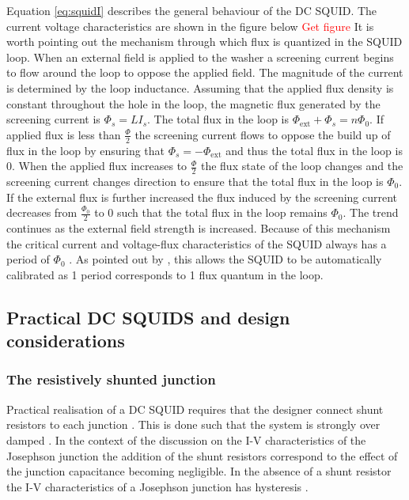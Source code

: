 Equation \ref{eq:squidI} describes the general behaviour of the DC SQUID. The current voltage characteristics are shown in the figure below \textcolor{red}{Get figure} \newline
It is worth pointing out the mechanism through which flux is quantized in the SQUID loop. When an external field is applied to the washer a screening current begins to flow around the loop to oppose the applied field. The magnitude of the current is determined by the loop inductance. Assuming that the applied flux density is constant throughout the hole in the loop, the magnetic flux generated by the screening current is $\Phi_s = LI_s$. The total flux in the loop is $\Phi_{\text{ext}} + \Phi_{s} = n\Phi_0$. If applied flux is less than $\frac{\Phi}{2}$ the screening current flows to oppose the build up of flux in the loop by ensuring that $\Phi_s = -\Phi_{\text{ext}}$ and thus the total flux in the loop is 0. When the applied flux increases to $\frac{\Phi}{2}$ the flux state of the loop changes and the screening current changes direction \cite{Drung2016NBSQUIDS} to ensure that the total flux in the loop is $\Phi_0$. If the external flux is further increased the flux induced by the screening current decreases from $\frac{\Phi_0}{2}$ to $0$ such that the total flux in the loop remains $\Phi_0$. The trend continues as the external field strength is increased. Because of this mechanism the critical current and voltage-flux characteristics of the SQUID always has a period of $\Phi_0$ \cite{SQUIDhandbook}. As pointed out by \cite{Drung2016NBSQUIDS}, this allows the SQUID to be automatically calibrated as 1 period corresponds to 1 flux quantum in the loop.

\subsection{Practical DC SQUIDS and design considerations}

\subsubsection*{The resistively shunted junction}
Practical realisation of a DC SQUID requires that the designer connect shunt resistors to each junction \cite{Drung2016NBSQUIDS}. This is done such that the system is strongly over damped \cite{SQUIDhandbook}. In the context of the discussion on the I-V characteristics  of the Josephson junction the addition of the shunt resistors correspond to the effect of the junction capacitance becoming negligible. In the absence of a shunt resistor the I-V characteristics of a Josephson junction has hysteresis \cite{Drung2016NBSQUIDS}. 


